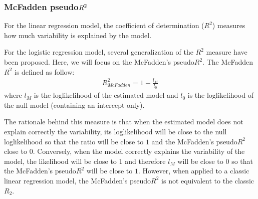 \documentclass[letterpaper,10pt,english]{jupyterBook}
\begin{document}
\subsubsection{McFadden pseudo\sphinxhyphen{}\protect\(R^2\protect\)}
\label{\detokenize{15.j. Logistic Regression:mcfadden-pseudo-r-2}}
\sphinxAtStartPar
For the linear regression model, the coefficient of determination (\(R^2\)) measures how much variability is explained by the model.

\sphinxAtStartPar
For the logistic regression model, several generalization of the \(R^2\) measure have been proposed. Here, we will focus on the McFadden’s pseudo\sphinxhyphen{}\(R^2\). The McFadden \(R^2\) is defined as follow:
\begin{equation*}
\begin{split}
R^2_{McFadden} = 1 - \frac{l_M}{l_0}
\end{split}
\end{equation*}
\sphinxAtStartPar
where \(l_M\) is the log\sphinxhyphen{}likelihood of the estimated model and \(l_0\) is the log\sphinxhyphen{}likelihood of the null model (containing an intercept only).

\sphinxAtStartPar
The rationale behind this measure is that when the estimated model does not explain correctly the variability, its log\sphinxhyphen{}likelihood will be close to the null log\sphinxhyphen{}likelihood so that the ratio will be close to \(1\) and the McFadden’s pseudo\sphinxhyphen{}\(R^2\) close to \(0\). Conversely, when the model correctly explains the variability of the model, the likelihood will be close to \(1\) and therefore \(l_M\) will be close to \(0\) so that the McFadden’s pseudo\sphinxhyphen{}\(R^2\) will be close to \(1\). However, when applied to a classic linear regression model, the McFadden’s pseudo\sphinxhyphen{}\(R^2\) is not equivalent to the classic \(R_2\).
\end{document}
